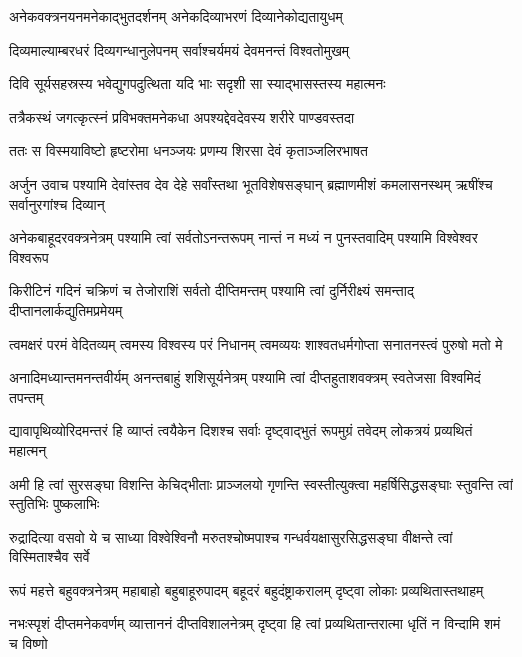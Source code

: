 \twolineshloka
{अनेकवक्त्रनयनमनेकाद्भुतदर्शनम्}
{अनेकदिव्याभरणं दिव्यानेकोद्यतायुधम्}%

\twolineshloka
{दिव्यमाल्याम्बरधरं दिव्यगन्धानुलेपनम्}
{सर्वाश्चर्यमयं देवमनन्तं विश्वतोमुखम्}%

\twolineshloka
{दिवि सूर्यसहस्रस्य भवेद्युगपदुत्थिता}
{यदि भाः सदृशी सा स्याद्भासस्तस्य महात्मनः}%

\twolineshloka
{तत्रैकस्थं जगत्कृत्स्नं प्रविभक्तमनेकधा}
{अपश्यद्देवदेवस्य शरीरे पाण्डवस्तदा}%

\twolineshloka
{ततः स विस्मयाविष्टो हृष्टरोमा धनञ्जयः}
{प्रणम्य शिरसा देवं कृताञ्जलिरभाषत}%

{अर्जुन उवाच}
\fourlineindentedshloka
{पश्यामि देवांस्तव देव देहे}
{सर्वांस्तथा भूतविशेषसङ्घान्}
{ब्रह्माणमीशं कमलासनस्थम्}
{ऋषींश्च सर्वानुरगांश्च दिव्यान्}%

\fourlineindentedshloka
{अनेकबाहूदरवक्त्रनेत्रम्}
{पश्यामि त्वां सर्वतोऽनन्तरूपम्}
{नान्तं न मध्यं न पुनस्तवादिम्}
{पश्यामि विश्वेश्वर विश्वरूप}%

\fourlineindentedshloka
{किरीटिनं गदिनं चक्रिणं च}
{तेजोराशिं सर्वतो दीप्तिमन्तम्}
{पश्यामि त्वां दुर्निरीक्ष्यं समन्ताद्}
{दीप्तानलार्कद्युतिमप्रमेयम्}%

\fourlineindentedshloka
{त्वमक्षरं परमं वेदितव्यम्}
{त्वमस्य विश्वस्य परं निधानम्}
{त्वमव्ययः शाश्वतधर्मगोप्ता}
{सनातनस्त्वं पुरुषो मतो मे}%

\fourlineindentedshloka
{अनादिमध्यान्तमनन्तवीर्यम्}
{अनन्तबाहुं शशिसूर्यनेत्रम्}
{पश्यामि त्वां दीप्तहुताशवक्त्रम्}
{स्वतेजसा विश्वमिदं तपन्तम्}%

\fourlineindentedshloka
{द्यावापृथिव्योरिदमन्तरं हि}
{व्याप्तं त्वयैकेन दिशश्च सर्वाः}
{दृष्ट्वाद्भुतं रूपमुग्रं तवेदम्}
{लोकत्रयं प्रव्यथितं महात्मन्}%

\fourlineindentedshloka
{अमी हि त्वां सुरसङ्घा विशन्ति}
{केचिद्भीताः प्राञ्जलयो गृणन्ति}
{स्वस्तीत्युक्त्वा महर्षिसिद्धसङ्घाः}
{स्तुवन्ति त्वां स्तुतिभिः पुष्कलाभिः}%

\fourlineindentedshloka
{रुद्रादित्या वसवो ये च साध्या}
{विश्वेश्विनौ मरुतश्चोष्मपाश्च}
{गन्धर्वयक्षासुरसिद्धसङ्घा}
{वीक्षन्ते त्वां विस्मिताश्चैव सर्वे}%

\fourlineindentedshloka
{रूपं महत्ते बहुवक्त्रनेत्रम्}
{महाबाहो बहुबाहूरुपादम्}
{बहूदरं बहुदंष्ट्राकरालम्}
{दृष्ट्वा लोकाः प्रव्यथितास्तथाहम्}%

\fourlineindentedshloka
{नभःस्पृशं दीप्तमनेकवर्णम्}
{व्यात्ताननं दीप्तविशालनेत्रम्}
{दृष्ट्वा हि त्वां प्रव्यथितान्तरात्मा}
{धृतिं न विन्दामि शमं च विष्णो}%

